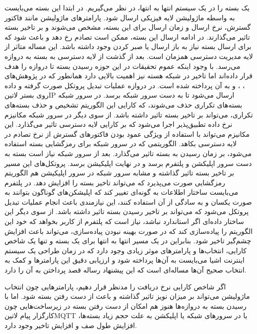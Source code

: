 یک بسته را در یک سیستم انتها به انتها، در نظر می‌گیریم. در ابتدا این بسته می‌بایست به واسطه ماژولیشن لایه فیزیکی ارسال شود.
پارامترهای ماژولیشن مانند فاکتور گسترش، نرخ ارسال و زمان ارسال برای این بسته، مشخص می‌شوند و بر تاخیر بسته تاثیر می‌گذارند.
در ادامه ارسال این بسته، ممکن است تصادم رخ دهد و باعث شود که برای ارسال بسته نیاز به باز ارسال
یا صبر کردن وجود داشته باشد. این مساله متاثر از لایه مدیریت دسترسی همزمان است. بعد از گذشت از لایه دسترسی به بسته به دروازه
می‌رسد.
با وجود اینکه عموم تحقیقات در این حوزه رسیدن بسته تا دروازه را هدف قرار داده‌اند اما تاخیر در شبکه هسته نیز اهمیت بالایی
دارد همانطور که در پژوهش‌های ، ،  و  به آن پرداخته شده است.
در دروازه عملیات تبدیل پروتکل صورت گرفته و داده روی بستر ‌لاتین{IP} ارسال می‌شود تا به دست سرور شبکه برسد.
در سرور شبکه بسته‌های تکراری حذف می‌شوند، که کارایی این الگوریتم تشخیص و حذف بسته‌های تکراری، می‌تواند بر تاخیر بسته تاثیر داشته باشد. از سوی دیگر در سرور شبکه
مکانیزم نرخ داده تطبیق‌پذیر اجرا می‌شود که بر کارایی لایه دسترسی تاثیر می‌گذارد. این مکانیزم می‌تواند با استفاده از ویژگی عمود بودن فاکتورهای گسترش
از نرخ تصادم در لایه دسترسی بکاهد. الگوریتمی که در سرور شبکه برای رمزگشایی بسته استفاده می‌شود، بر زمان رسیدن به بسته تاثیر می‌گذارد.
بعد از سرور شبکه نیاز است بسته به دست سرور اپلیکشن و پلتفرم برسد و در نهایت اپلیکیشن برسد. پروتکل‌های این مسیر بر تاخیر بسته تاثیر گذاشته
و مشابه سرور شبکه در سرور اپلیکیشن هم الگوریتم رمزگشایی صورت می‌پذیرد که می‌تواند تاخیر بسته را افزایش دهد.
در پلتفرم می‌بایست ساختار اطلاعات به گونه‌ای تغییر کند که اپلیشکن‌های گوناگون بتوانند به صورت یکسان و به سادگی از آن استفاده کنند،
این نیازمندی باعث انجام عملیات تبدیل پروتکل می‌شود که می‌تواند بر تاخیر رسیدن بسته تاثیر داشته باشد. از سوی دیگر این ساختار داده‌ای
اگر استاندارد نباشد، نیاز است که پلتفرم از کاربر بخواهد که خود این الگوریتم را پیاده‌سازی کند که در صورت بهینه نبودن پیاده‌سازی، می‌تواند باعث
افزایش چشم‌گیر تاخیر شود.
بنابراین در یک مسیر انتها به انتها برای یک بسته و تنها یک شاخص کارایی، انتخاب‌ها و پارامترهای موثر زیادی وجود دارد
که در زمان طراحی یک سیستم اینترنت اشیا می‌بایست به آن‌ها پرداخته شود و ارزیابی دقیق این پارامترها و کمک به انتخاب صحیح آن‌ها
مساله‌ای است که این پیشنهاد رساله قصد پرداختن به آن را دارد.

اگر شاخص کارایی نرخ دریافت را مدنظر قرار دهیم، پارامترهایی چون انتخاب ماژولیشن می‌تواند بر میزان نویز تاثیر گذاشته و باعث از دست رفتن بسته شود.
اما با رسیدن بسته به دروازه‌ها هنوز هم امکان از دست رفتن بسته در زیرساخت‌هایی چون کارگزار پیام ‌لاتین{MQTT} یا در سرورهای
شبکه یا اپلیکشن به علت حجم زیاد بسته‌ها، افزایش طول صف و افزایش تاخیر وجود دارد.


